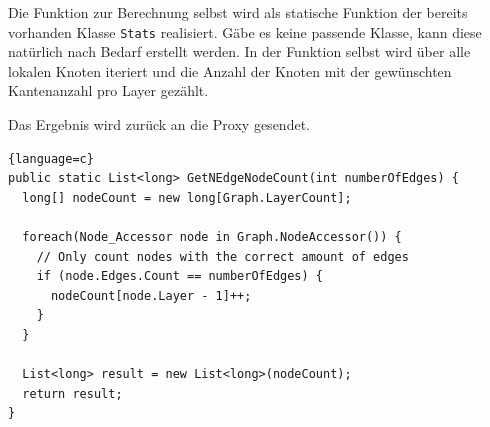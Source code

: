 Die Funktion zur Berechnung selbst wird als statische Funktion der bereits vorhanden Klasse \verb|Stats| realisiert. Gäbe es keine passende Klasse, kann diese natürlich nach Bedarf erstellt werden.
In der Funktion selbst wird über alle lokalen Knoten iteriert und die Anzahl der Knoten mit der gewünschten Kantenanzahl pro Layer gezählt. 

Das Ergebnis wird zurück an die Proxy gesendet.

\begin{lstlisting}{language=c}
public static List<long> GetNEdgeNodeCount(int numberOfEdges) {
  long[] nodeCount = new long[Graph.LayerCount];

  foreach(Node_Accessor node in Graph.NodeAccessor()) {
    // Only count nodes with the correct amount of edges
    if (node.Edges.Count == numberOfEdges) {
      nodeCount[node.Layer - 1]++;
    }
  }

  List<long> result = new List<long>(nodeCount);
  return result;
}
\end{lstlisting}





